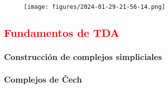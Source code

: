 \documentclass[a4paper,11pt]{article}
\newcommand{\red}[1]{\textcolor{red}{#1}}
\begin{document}
\begin{figure}[!htb]
    \centering
    \texttt{[image: figures/2024-01-29-21-56-14.png]}
    \caption{}%
\end{figure}


\pagebreak
\subsection{\red{Fundamentos de TDA}}






\subsubsection{Construcción de complejos simpliciales}




\subsubsection*{Complejos de Čech}
\end{document}

